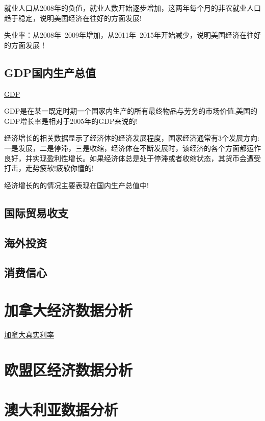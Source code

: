 就业人口从2008年的负值，就业人数开始逐步增加，这两年每个月的非农就业人口趋于稳定，说明美国经济在往好的方面发展!

失业率：从2008年~2009年增加，从2011年~2015年开始减少，说明美国经济在往好的方面发展！

\subsection{GDP国内生产总值}
\href{http://data.worldbank.org/indicator/NY.GDP.MKTP.KD.ZG/countries/1W-US?display=graph}{GDP}


GDP是在某一既定时期一个国家内生产的所有最终物品与劳务的市场价值,美国的GDP增长率是相对于2005年的GDP来说的!


经济增长的相关数据显示了经济体的经济发展程度，国家经济通常有3个发展方向:一是发展，二是停滞，三是收缩，经济体在不断发展时，该经济的各个方面都运作良好，并实现盈利性增长。如果经济体总是处于停滞或者收缩状态，其货币会遭受打击，走势疲软!疲软你懂的!

经济增长的的情况主要表现在国内生产总值中!


\subsection{国际贸易收支}

\subsection{海外投资}
\subsection{消费信心}



\section{加拿大经济数据分析}

\href{http://data.worldbank.org/indicator/FR.INR.RINR/countries/CA?display=graph}{加拿大真实利率}

\section{欧盟区经济数据分析}


\section{澳大利亚数据分析}
